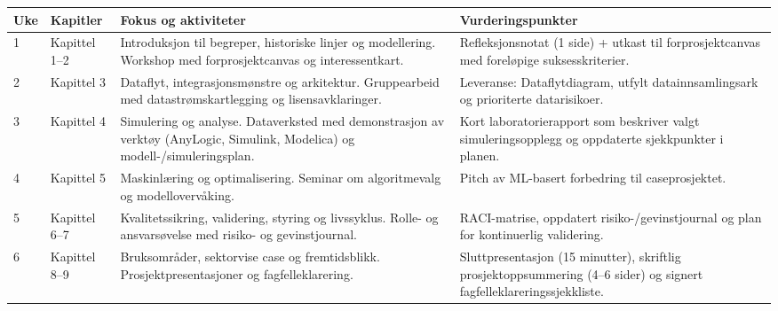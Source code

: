 \begin{tabular}{p{1.3cm}p{4cm}p{5.2cm}p{4cm}}
\toprule
\textbf{Uke} & \textbf{Kapitler} & \textbf{Fokus og aktiviteter} & \textbf{Vurderingspunkter} \\
\midrule
1 & Kapittel 1--2 & Introduksjon til begreper, historiske linjer og modellering. Workshop med forprosjektcanvas og interessentkart. & Refleksjonsnotat (1 side) + utkast til forprosjektcanvas med foreløpige suksesskriterier. \\
2 & Kapittel 3 & Dataflyt, integrasjonsmønstre og arkitektur. Gruppearbeid med datastrømskartlegging og lisensavklaringer. & Leveranse: Dataflytdiagram, utfylt datainnsamlingsark og prioriterte datarisikoer. \\
3 & Kapittel 4 & Simulering og analyse. Dataverksted med demonstrasjon av verktøy (AnyLogic, Simulink, Modelica) og modell-/simuleringsplan. & Kort laboratorierapport som beskriver valgt simuleringsopplegg og oppdaterte sjekkpunkter i planen. \\
4 & Kapittel 5 & Maskinlæring og optimalisering. Seminar om algoritmevalg og modellovervåking. & Pitch av ML-basert forbedring til caseprosjektet. \\
5 & Kapittel 6--7 & Kvalitetssikring, validering, styring og livssyklus. Rolle- og ansvarsøvelse med risiko- og gevinstjournal. & RACI-matrise, oppdatert risiko-/gevinstjournal og plan for kontinuerlig validering. \\
6 & Kapittel 8--9 & Bruksområder, sektorvise case og fremtidsblikk. Prosjektpresentasjoner og fagfelleklarering. & Sluttpresentasjon (15 minutter), skriftlig prosjektoppsummering (4--6 sider) og signert fagfelleklareringssjekkliste. \\
\bottomrule
\end{tabular}

